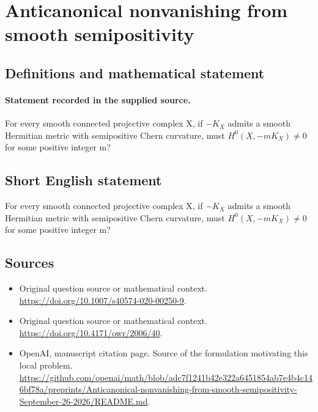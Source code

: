 \documentclass[11pt]{article}
\begin{document}
\section*{Anticanonical nonvanishing from smooth semipositivity}\label{30007066}
\subsection{Definitions and mathematical statement}
\paragraph{Statement recorded in the supplied source.}
For every smooth connected projective complex X, if $-K_X$ admits a smooth Hermitian metric with semipositive Chern curvature, must $H^{0}(X,-mK_X)\neq 0$ for some positive integer m?
\subsection{Short English statement}
For every smooth connected projective complex X, if $-K_X$ admits a smooth Hermitian metric with semipositive Chern curvature, must $H^{0}(X,-mK_X)\neq 0$ for some positive integer m?
\subsection{Sources}
\begin{itemize}
\item[S1] Original question source or mathematical context.
\url{https://doi.org/10.1007/s40574-020-00250-9}.
\item[S2] Original question source or mathematical context.
\url{https://doi.org/10.4171/owr/2006/40}.
\item[S3] OpenAI, manuscript citation page. Source of the formulation motivating this local problem.
\url{https://github.com/openai/math/blob/adc7f1241b42e322a6451854ab7e4b4c146bf78a/preprints/Anticanonical-nonvanishing-from-smooth-semipositivity-September-26-2026/README.md}.
\end{itemize}
\end{document}
